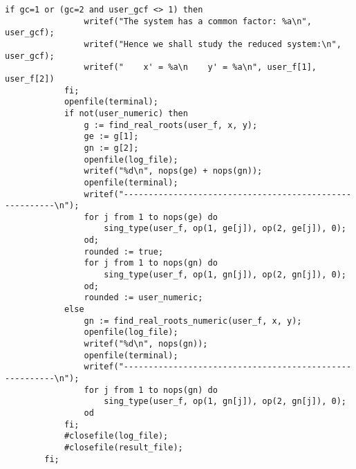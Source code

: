 \documentclass[a4paper,10pt]{article}
\begin{document}
\begin{lstlisting}[name=main]
            if gc=1 or (gc=2 and user_gcf <> 1) then
                writef("The system has a common factor: %a\n", user_gcf);
                writef("Hence we shall study the reduced system:\n", user_gcf);
                writef("    x' = %a\n    y' = %a\n", user_f[1], user_f[2])
            fi;
            openfile(terminal);
            if not(user_numeric) then
                g := find_real_roots(user_f, x, y);
                ge := g[1];
                gn := g[2];
                openfile(log_file);
                writef("%d\n", nops(ge) + nops(gn));
                openfile(terminal);
                writef("--------------------------------------------------------\n");
                for j from 1 to nops(ge) do
                    sing_type(user_f, op(1, ge[j]), op(2, ge[j]), 0);
                od;
                rounded := true;
                for j from 1 to nops(gn) do
                    sing_type(user_f, op(1, gn[j]), op(2, gn[j]), 0);
                od;
                rounded := user_numeric;
            else
                gn := find_real_roots_numeric(user_f, x, y);
                openfile(log_file);
                writef("%d\n", nops(gn));
                openfile(terminal);
                writef("--------------------------------------------------------\n");
                for j from 1 to nops(gn) do
                    sing_type(user_f, op(1, gn[j]), op(2, gn[j]), 0);
                od
            fi;
            #closefile(log_file);
            #closefile(result_file);
        fi;


\end{lstlisting}
\end{document}
